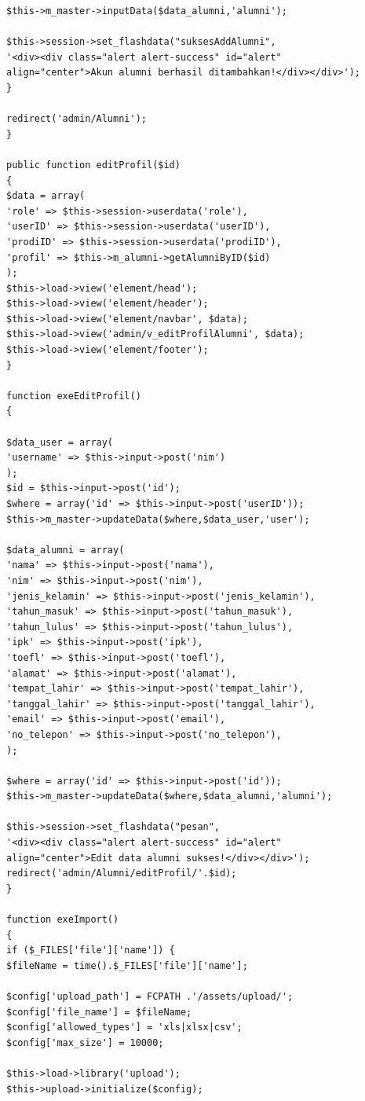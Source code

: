 \begin{verbatim}
$this->m_master->inputData($data_alumni,'alumni');

$this->session->set_flashdata("suksesAddAlumni", 
'<div><div class="alert alert-success" id="alert" 
align="center">Akun alumni berhasil ditambahkan!</div></div>');
}

redirect('admin/Alumni');
}

public function editProfil($id)
{
$data = array(
'role' => $this->session->userdata('role'),
'userID' => $this->session->userdata('userID'),
'prodiID' => $this->session->userdata('prodiID'),
'profil' => $this->m_alumni->getAlumniByID($id)
);
$this->load->view('element/head');
$this->load->view('element/header');
$this->load->view('element/navbar', $data);
$this->load->view('admin/v_editProfilAlumni', $data);
$this->load->view('element/footer');
}

function exeEditProfil()
{

$data_user = array(
'username' => $this->input->post('nim')
);
$id = $this->input->post('id');
$where = array('id' => $this->input->post('userID'));
$this->m_master->updateData($where,$data_user,'user');

$data_alumni = array(
'nama' => $this->input->post('nama'),
'nim' => $this->input->post('nim'),
'jenis_kelamin' => $this->input->post('jenis_kelamin'),
'tahun_masuk' => $this->input->post('tahun_masuk'),
'tahun_lulus' => $this->input->post('tahun_lulus'),
'ipk' => $this->input->post('ipk'),
'toefl' => $this->input->post('toefl'),
'alamat' => $this->input->post('alamat'),
'tempat_lahir' => $this->input->post('tempat_lahir'),
'tanggal_lahir' => $this->input->post('tanggal_lahir'),
'email' => $this->input->post('email'),
'no_telepon' => $this->input->post('no_telepon'),
);

$where = array('id' => $this->input->post('id'));
$this->m_master->updateData($where,$data_alumni,'alumni');

$this->session->set_flashdata("pesan", 
'<div><div class="alert alert-success" id="alert" 
align="center">Edit data alumni sukses!</div></div>');
redirect('admin/Alumni/editProfil/'.$id);
}

function exeImport()
{
if ($_FILES['file']['name']) {
$fileName = time().$_FILES['file']['name'];

$config['upload_path'] = FCPATH .'/assets/upload/';
$config['file_name'] = $fileName;
$config['allowed_types'] = 'xls|xlsx|csv';
$config['max_size'] = 10000;

$this->load->library('upload');
$this->upload->initialize($config);


\end{verbatim}
